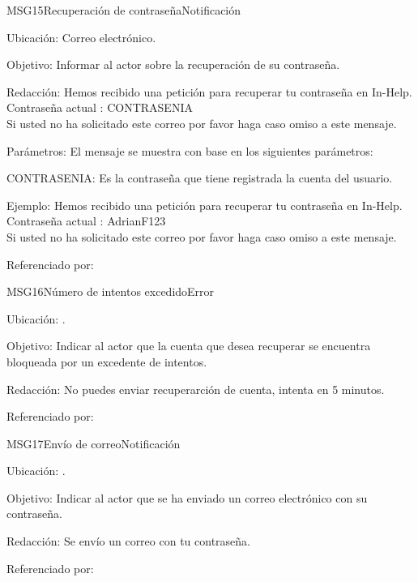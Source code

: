 \begin{mensaje}{MSG15}{Recuperación de contraseña}{Notificación}
	\item[Ubicación:] Correo electrónico.
	\item[Objetivo:] Informar al actor sobre la recuperación de su contraseña.
	\item[Redacción:] Hemos recibido una petición para recuperar tu contraseña en In-Help.\\
	Contraseña actual : CONTRASENIA\\
	Si usted no ha solicitado este correo por favor haga caso omiso a este mensaje.
	\item[Parámetros:] El mensaje se muestra con base en los siguientes parámetros:
	\begin{Citemize}
		\item CONTRASENIA: Es la contraseña que tiene registrada la cuenta del usuario.
	\end{Citemize}
	\item[Ejemplo:] Hemos recibido una petición para recuperar tu contraseña en In-Help.\\
	Contraseña actual : AdrianF123\\
	Si usted no ha solicitado este correo por favor haga caso omiso a este mensaje.
	\item[Referenciado por:] 
\end{mensaje}

\begin{mensaje}{MSG16}{Número de intentos excedido}{Error}
	\item[Ubicación:] \msjEmergente.
	\item[Objetivo:] Indicar al actor que la cuenta que desea recuperar se encuentra bloqueada por un excedente de intentos.
	\item[Redacción:] No puedes enviar recuperarción de cuenta, intenta en 5 minutos.
	\item[Referenciado por:] 
\end{mensaje}


\begin{mensaje}{MSG17}{Envío de correo}{Notificación}
	\item[Ubicación:] \msjEmergente.
	\item[Objetivo:] Indicar al actor que se ha enviado un correo electrónico con su contraseña.
	\item[Redacción:] Se envío un correo con tu contraseña.
	\item[Referenciado por:] 
\end{mensaje}